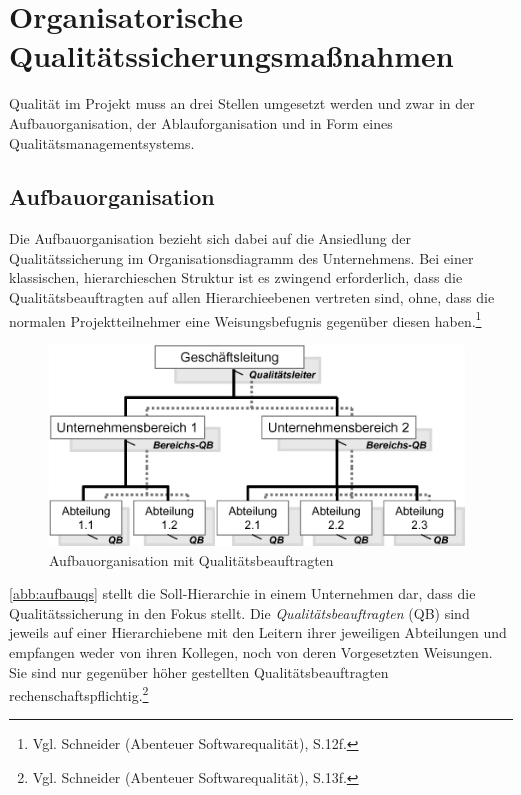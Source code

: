 %
%
    \section{Organisatorische Qualitätssicherungsmaßnahmen}

        Qualität im Projekt muss an drei Stellen umgesetzt werden und zwar in der Aufbauorganisation, der Ablauforganisation und in Form eines Qualitätsmanagementsystems.

        \subsection{Aufbauorganisation}

            Die Aufbauorganisation bezieht sich dabei auf die Ansiedlung der Qualitätssicherung im Organisationsdiagramm des Unternehmens. Bei einer klassischen, hierarchieschen Struktur ist es zwingend erforderlich, dass die Qualitätsbeauftragten auf allen Hierarchieebenen vertreten sind, ohne, dass die normalen Projektteilnehmer eine Weisungsbefugnis gegenüber diesen haben.\footnote{Vgl. Schneider (Abenteuer Softwarequalität), S.12f.}

            \begin{figure}[!htbp]
                \begin{center}
                    \includegraphics[width=11cm]{Abbildungen/aufbauqs}
                    \caption[Aufbauorganisation mit Qualitätsbeauftragten]{Aufbauorganisation mit Qualitätsbeauftragten\protect\footnotemark}
                    \label{abb:aufbauqs}
                \end{center}
            \end{figure}


            \autoref{abb:aufbauqs} stellt die Soll-Hierarchie in einem Unternehmen dar, dass die Qualitätssicherung in den Fokus stellt. Die \emph{Qualitätsbeauftragten} (QB) sind jeweils auf einer Hierarchiebene mit den Leitern ihrer jeweiligen Abteilungen und empfangen weder von ihren Kollegen, noch von deren Vorgesetzten Weisungen. Sie sind nur gegenüber höher gestellten Qualitätsbeauftragten rechenschaftspflichtig.\footnote{Vgl. Schneider (Abenteuer Softwarequalität), S.13f.}

